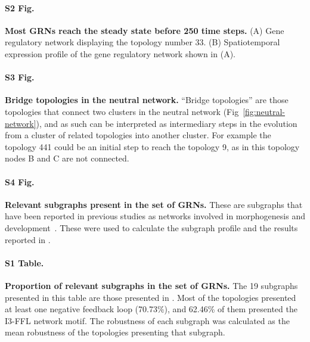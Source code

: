 \documentclass[10pt,letterpaper]{article}
\begin{document}
\paragraph*{S2 Fig.}
\label{S2_Fig}
{\bf Most GRNs reach the steady state before 250 time steps.}
(A) Gene regulatory network displaying the topology number 33. (B) Spatiotemporal
expression profile of the gene regulatory network shown in (A).

\paragraph*{S3 Fig.}
\label{S3_Fig}
{\bf Bridge topologies in the neutral network.}
``Bridge topologies'' are those topologies that connect two clusters in the neutral
network (Fig~\ref{fig:neutral-network}), and as such can be interpreted as
intermediary steps in the evolution from a cluster of related topologies into
another cluster. For example the topology 441 could be an initial step to reach the
topology 9, as in this topology nodes B and C are not connected.

\paragraph*{S4 Fig.}
\label{S4_Fig}
{\bf Relevant subgraphs present in the set of GRNs.}
These are subgraphs that have been reported in previous studies as networks
involved in morphogenesis and development~\cite{Cotterell2010, Schaerli2014,
Schaerli2018}. These were used to calculate the subgraph profile and the results
reported in .

\paragraph*{S1 Table.}
\label{S1_Table}
{\bf Proportion of relevant subgraphs in the set of GRNs.}
The 19 subgraphs presented in this table are those presented in .
Most of the topologies presented at least one negative feedback loop (70.73\%),
and 62.46\% of them presented the I3-FFL network motif. The robustness of each
subgraph was calculated as the mean robustness of the topologies presenting that
subgraph.

\nolinenumbers
\end{document}
